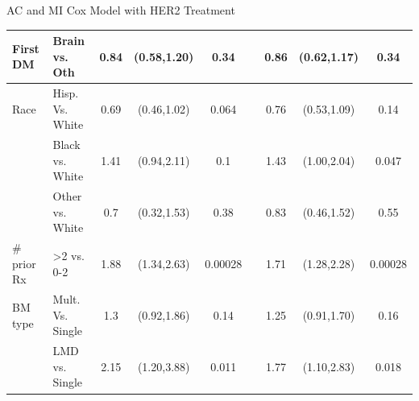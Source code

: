 \begin{frame}{AC and MI Cox Model with HER2 Treatment}
\begin{table}[]
{\begin{tabular}{|l|l|c|c|c|c|c|c|c|}
First DM                       & Brain vs. Oth                    & 0.84                  & (0.58,1.20)                                        & 0.34                  &                       & 0.86 & (0.62,1.17)                                                          & 0.34                                                        \\ \hline
Race                           & Hisp. Vs. White                  & 0.69                  & (0.46,1.02)                                        & 0.064                 &                       & 0.76 & (0.53,1.09)                                                          & 0.14                                                        \\ \hline
                               & Black vs. White                  & 1.41                  & (0.94,2.11)                                        & 0.1                   &                       & 1.43 & (1.00,2.04)                                                          & 0.047                                                       \\ \hline
                               & Other vs. White                  & 0.7                   & (0.32,1.53)                                        & 0.38                  &                       & 0.83 & (0.46,1.52)                                                          & 0.55                                                        \\ \hline
\# prior Rx                    & \textgreater2 vs. 0-2            & 1.88                  & (1.34,2.63)                                        & 0.00028               &                       & 1.71 & (1.28,2.28)                                                          & 0.00028                                                     \\ \hline
BM type                        & Mult. Vs. Single                 & 1.3                   & (0.92,1.86)                                        & 0.14                  &                       & 1.25 & (0.91,1.70)                                                          & 0.16                                                        \\ \hline
                               & LMD vs. Single                   & 2.15                  & (1.20,3.88)                                        & 0.011                 &                       & 1.77 & (1.10,2.83)                                                          & 0.018                                                       \\ \hline

\end{tabular}}
\end{table}
\end{frame}
